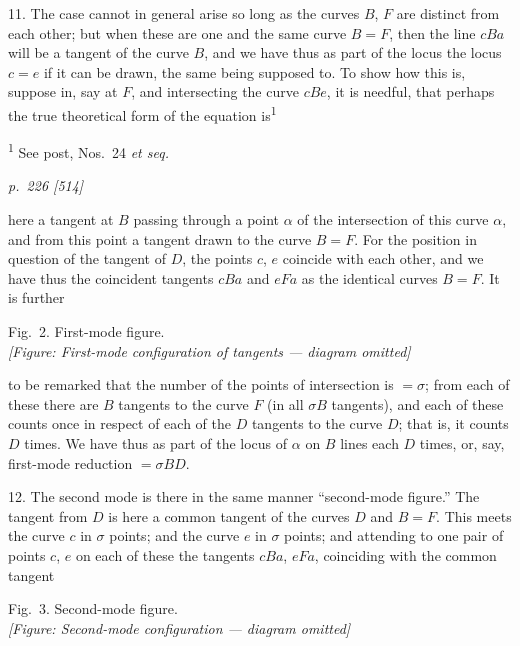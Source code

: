 \documentclass[11pt,a4paper]{book}
\begin{document}
11. The case cannot in general arise so long as the curves $B$, $F$ are distinct
from each other; but when these are one and the same curve $B=F$, then the line
$cBa$ will be a tangent of the curve $B$, and we have thus as part of the locus the
locus $c=e$ if it can be drawn, the same being supposed to. To show how this is, suppose
in, say at $F$, and intersecting the curve $cBe$, it is needful, that perhaps the true theoretical
form of the equation is\textsuperscript{1}

\vspace{0.5em}
\noindent\textsuperscript{1} See post, Nos.\ 24 \textit{et seq.}

\clearpage

\bigskip
\textit{p.~226 [514]}
\smallskip

here a tangent at $B$ passing through a point $\alpha$ of the intersection of this curve
$\alpha$, and from this point a tangent drawn to the curve $B=F$.  For the position in
question of the tangent of $D$, the points $c$, $e$ coincide with each other, and we have
thus the coincident tangents $cBa$ and $eFa$ as the identical curves $B=F$.  It is further

\begin{center}
Fig.\ 2.  First-mode figure.\\
\textit{[Figure: First-mode configuration of tangents --- diagram omitted]}
\end{center}

to be remarked that the number of the points of intersection is $=\sigma$; from each of
these there are $B$ tangents to the curve $F$ (in all $\sigma B$ tangents), and each of
these counts once in respect of each of the $D$ tangents to the curve $D$; that is, it
counts $D$ times.  We have thus as part of the locus of $\alpha$ on $B$ lines each $D$ times,
or, say, first-mode reduction $=\sigma BD$.

12. The second mode is there in the same manner ``second-mode figure.''  The
tangent from $D$ is here a common tangent of the curves $D$ and $B=F$.  This meets
the curve $c$ in $\sigma$ points; and the curve $e$ in $\sigma$ points; and attending to one pair
of points $c$, $e$ on each of these the tangents $cBa$, $eFa$, coinciding with the common tangent

\begin{center}
Fig.\ 3.  Second-mode figure.\\
\textit{[Figure: Second-mode configuration --- diagram omitted]}
\end{center}
\end{document}
